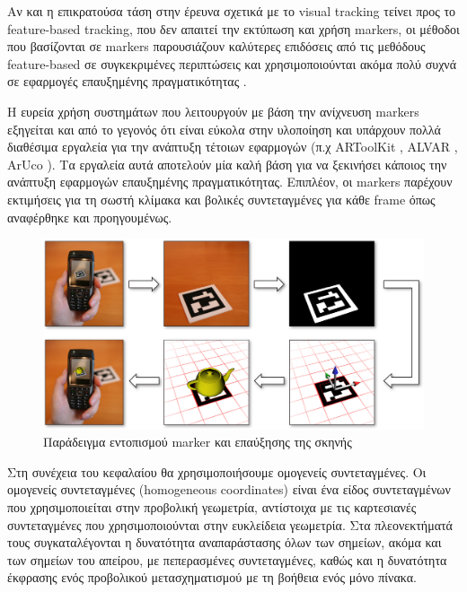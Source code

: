Αν και η επικρατούσα τάση στην έρευνα σχετικά με το visual tracking τείνει προς το feature-based tracking, που δεν απαιτεί την εκτύπωση και χρήση markers, οι μέθοδοι που βασίζονται σε markers παρουσιάζουν καλύτερες επιδόσεις από τις μεθόδους feature-based σε συγκεκριμένες περιπτώσεις και χρησιμοποιούνται ακόμα πολύ συχνά σε εφαρμογές επαυξημένης πραγματικότητας \cite{wagner2008robust} \cite{rabbi2014applications} .


Η ευρεία χρήση συστημάτων που λειτουργούν με βάση την ανίχνευση markers εξηγείται και από το γεγονός ότι είναι εύκολα στην υλοποίηση και υπάρχουν πολλά διαθέσιμα εργαλεία για την ανάπτυξη τέτοιων εφαρμογών (π.χ ARToolKit \cite{artoolkit}, ALVAR \cite{alvar}, ArUco \cite{aruco}). Τα εργαλεία αυτά αποτελούν μία καλή βάση για να ξεκινήσει κάποιος την ανάπτυξη εφαρμογών επαυξημένης πραγματικότητας. Επιπλέον, οι markers παρέχουν εκτιμήσεις για τη σωστή κλίμακα και βολικές συντεταγμένες για κάθε frame όπως αναφέρθηκε και προηγουμένως. 



\begin{figure}[H]
    \centering
    \includegraphics[scale=0.6, angle=0]{Files/Figures/HowMarkersWork.jpg}
    \caption[Παράδειγμα εντοπισμού marker και επαύξησης της σκηνής]{ Παράδειγμα εντοπισμού marker και επαύξησης της σκηνής \cite{howmarkerswork}}
    \label{fig:howmarkerswork}
\end{figure}


Στη συνέχεια του κεφαλαίου θα χρησιμοποιήσουμε ομογενείς συντεταγμένες. Οι ομογενείς συντεταγμένες (homogeneous coordinates) είναι ένα είδος συντεταγμένων που χρησιμοποιείται στην προβολική γεωμετρία, αντίστοιχα με τις καρτεσιανές συντεταγμένες που χρησιμοποιούνται στην ευκλείδεια γεωμετρία. Στα πλεονεκτήματά τους συγκαταλέγονται η δυνατότητα αναπαράστασης όλων των σημείων, ακόμα και των σημείων του απείρου, με πεπερασμένες συντεταγμένες, καθώς και η δυνατότητα έκφρασης ενός προβολικού μετασχηματισμού με τη βοήθεια ενός μόνο πίνακα.



